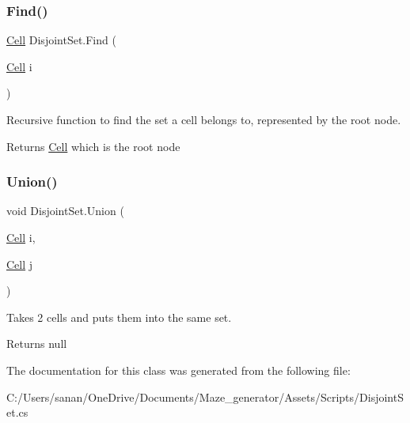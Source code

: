 \subsubsection{\texorpdfstring{Find()}{Find()}}
{\footnotesize\ttfamily \mbox{\hyperlink{class_cell}{Cell}} Disjoint\+Set.\+Find (\begin{DoxyParamCaption}\item[{\mbox{\hyperlink{class_cell}{Cell}}}]{i }\end{DoxyParamCaption})}



Recursive function to find the set a cell belongs to, represented by the root node. 

\begin{DoxyReturn}{Returns}
\mbox{\hyperlink{class_cell}{Cell}} which is the root node 
\end{DoxyReturn}
\mbox{\label{class_disjoint_set_a5c28601d0773150fd191ed4d2f5f6f0a}} 
\subsubsection{\texorpdfstring{Union()}{Union()}}
{\footnotesize\ttfamily void Disjoint\+Set.\+Union (\begin{DoxyParamCaption}\item[{\mbox{\hyperlink{class_cell}{Cell}}}]{i,  }\item[{\mbox{\hyperlink{class_cell}{Cell}}}]{j }\end{DoxyParamCaption})}



Takes 2 cells and puts them into the same set. 

\begin{DoxyReturn}{Returns}
null 
\end{DoxyReturn}


The documentation for this class was generated from the following file\+:\begin{DoxyCompactItemize}
\item 
C\+:/\+Users/sanan/\+One\+Drive/\+Documents/\+Maze\+\_\+generator/\+Assets/\+Scripts/Disjoint\+Set.\+cs\end{DoxyCompactItemize}
